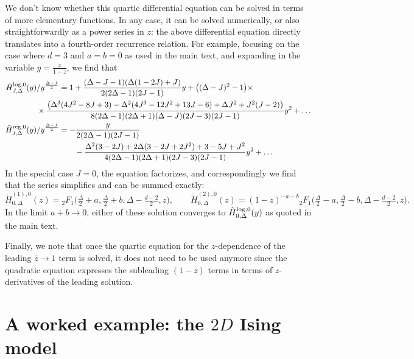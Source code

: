 \documentclass[11pt, reqno,preprint]{article}
\def\be{\begin{equation}}
\def\ee{\end{equation}}
\def\sreg{{\rm reg}}
\def\slog{{\rm log}}
\def\zbar{\bar{z}}
\def\j{J}
\begin{document}
\begin{appendix}
We don't know whether this quartic differential equation can be solved in terms of more elementary functions.
In any case, it can be solved numerically, or also
straightforwardly as a power series in $z$: the above differential equation
directly translates into a fourth-order recurrence relation.
For example, focusing on the case where $d=3$ and $a=b=0$ as used in the main text,
and expanding in the variable $y=\frac{z}{1-z}$, we find that
\be\begin{aligned}
\tilde{H}_{\j,\Delta}^{\slog,0}(y)/y^{\frac{\Delta-\j}{2}} &= 
1+ \frac{(\Delta-\j-1)(\Delta(1-2\j)+\j)}{2(2\Delta-1)(2\j-1)} y + \big((\Delta-\j)^2-1\big)\times
\\&\hspace{-10mm} \times\frac{\big(\Delta^3(4\j^2-8\j+3)-\Delta^2(4\j^3-12\j^2+13\j-6)+\Delta \j^2+\j^2(\j-2)\big)}
{8(2\Delta-1)(2\Delta+1)(\Delta-\j)(2\j-3)(2\j-1)}y^2 +\ldots
\\
\tilde{H}_{\j,\Delta}^{\sreg,0}(y)/y^{\frac{\Delta-\j}{2}} &=
-\frac{y}{2(2\Delta-1)(2\j-1)} \\
& \qquad -\frac{\Delta^2(3-2\j)+2\Delta(3-2\j+2\j^2)+3-5\j+\j^2}{4(2\Delta-1)(2\Delta+1)(2\j-3)(2\j-1)}y^2 + \ldots \label{example_cross_series}
\end{aligned}\ee
In the special case $\j=0$, the equation factorizes, and correspondingly we find that the series simplifies
and can be summed exactly:
\be
 \tilde{H}_{0,\Delta}^{(1),0}(z) ={}_2F_1\big(\tfrac{\Delta}{2}+a,\tfrac{\Delta}{2}+b,\Delta-\tfrac{d-2}{2},z\big),
 \qquad
  \tilde{H}_{0,\Delta}^{(2),0}(z) =(1-z)^{-a-b}{}_2F_1\big(\tfrac{\Delta}{2}-a,\tfrac{\Delta}{2}-b,\Delta-\tfrac{d-2}{2},z\big).
\label{exact_j0}
\ee
In the limit $a+b\to 0$, either of these solution converges to $\tilde{H}_{0,\Delta}^{\slog,0}(y)$
as quoted in the main text.

Finally, we note that once the quartic equation for the $z$-dependence of the leading $\zbar\to 1$ term is solved,
it does not need to be used anymore since the quadratic equation expresses the subleading $(1-\zbar)$ terms
in terms of $z$-derivatives of the leading solution.




\section{A worked example: the $2D$ Ising model}
\label{app:Ising}


\end{appendix}
\end{document}
